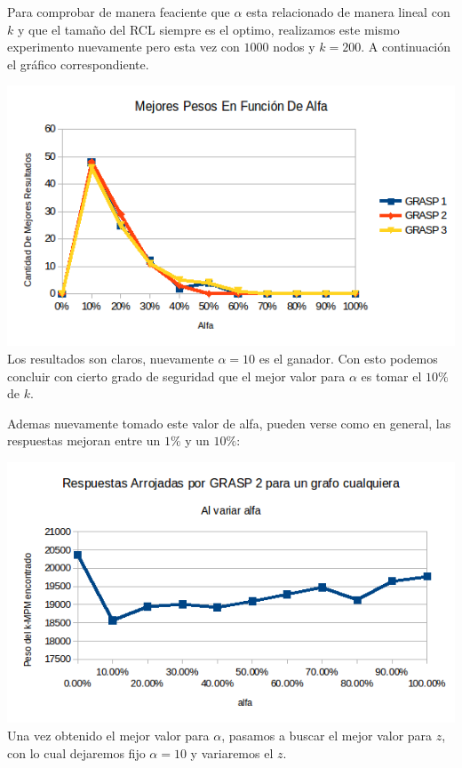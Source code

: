 Para comprobar de manera feaciente que $\alpha$ esta relacionado de manera lineal con $k$ y que el tamaño del RCL siempre es el optimo, realizamos este mismo experimento nuevamente pero esta vez con $1000$ nodos y $k=200$. A continuación el gráfico correspondiente.

\includegraphics[scale=0.7]{Ej5/respuestasAlfa2.png}\\

Los resultados son claros, nuevamente $\alpha=10$ es el ganador. Con esto podemos concluir con cierto grado de seguridad que el mejor valor para $\alpha$ es tomar el $10\%$ de $k$.

Ademas nuevamente tomado este valor de alfa, pueden verse como en general, las respuestas mejoran entre un $1 \%$ y un $10 \%$:

\includegraphics[scale=0.7]{Ej5/ejemploAlfa2.png}\\

Una vez obtenido el mejor valor para $\alpha$, pasamos a buscar el mejor valor para $z$, con lo cual dejaremos fijo $\alpha=10$ y variaremos el $z$.

